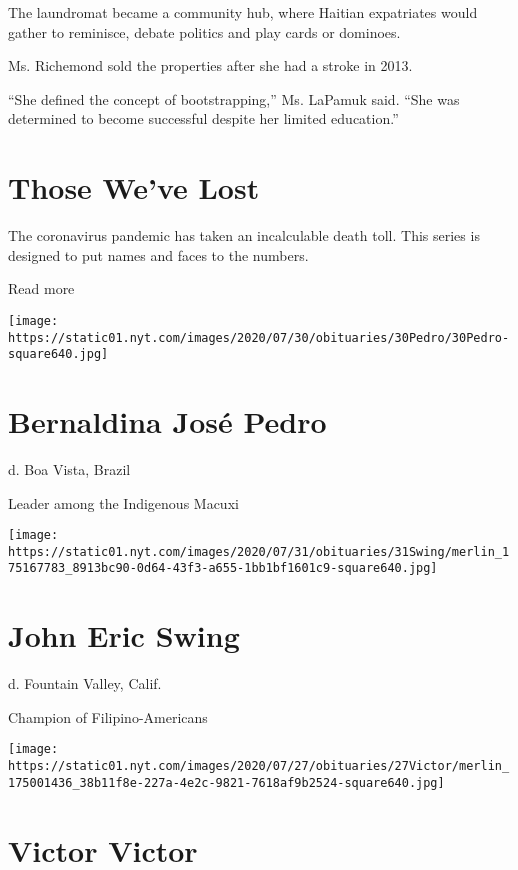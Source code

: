 The laundromat became a community hub, where Haitian expatriates would
gather to reminisce, debate politics and play cards or dominoes.

Ms. Richemond sold the properties after she had a stroke in 2013.

``She defined the concept of bootstrapping,'' Ms. LaPamuk said. ``She
was determined to become successful despite her limited education.''

\href{https://www.nytimes.com/interactive/2020/obituaries/people-died-coronavirus-obituaries.html?action=click\&pgtype=Article\&state=default\&region=BELOW_MAIN_CONTENT\&context=covid_obits_promo}{}

\hypertarget{those-weve-lost}{%
\section{Those We've Lost}\label{those-weve-lost}}

The coronavirus pandemic has taken an incalculable death toll. This
series is designed to put names and faces to the numbers.

Read more

\texttt{[image: https://static01.nyt.com/images/2020/07/30/obituaries/30Pedro/30Pedro-square640.jpg]}

\hypertarget{bernaldina-josuxe9-pedro}{%
\section{Bernaldina José Pedro}\label{bernaldina-josuxe9-pedro}}

d. Boa Vista, Brazil

Leader among the Indigenous Macuxi

\texttt{[image: https://static01.nyt.com/images/2020/07/31/obituaries/31Swing/merlin\_175167783\_8913bc90-0d64-43f3-a655-1bb1bf1601c9-square640.jpg]}

\hypertarget{john-eric-swing}{%
\section{John Eric Swing}\label{john-eric-swing}}

d. Fountain Valley, Calif.

Champion of Filipino-Americans

\texttt{[image: https://static01.nyt.com/images/2020/07/27/obituaries/27Victor/merlin\_175001436\_38b11f8e-227a-4e2c-9821-7618af9b2524-square640.jpg]}

\hypertarget{victor-victor}{%
\section{Victor Victor}\label{victor-victor}}

